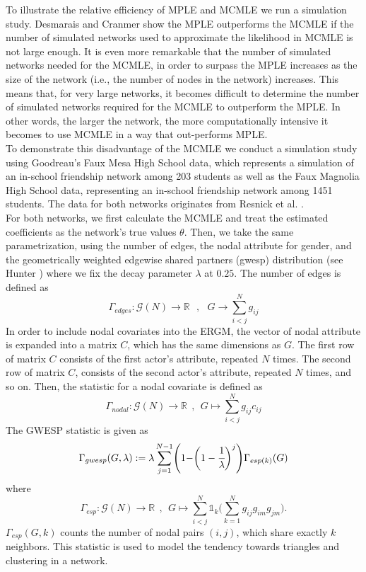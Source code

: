 \documentclass[10pt, conference, compsocconf]{IEEEtran}
\begin{document}
To illustrate the relative efficiency of MPLE and MCMLE we run a simulation study. Desmarais and Cranmer \cite{Desmarais.2012} show the MPLE outperforms the MCMLE if the number of simulated networks used to approximate the likelihood in MCMLE is not large enough. It is even more remarkable that the number of simulated networks needed for the MCMLE, in order to surpass the MPLE increases as the size of the network (i.e., the number of nodes in the network) increases. This means that, for very large networks, it becomes difficult to determine the number of simulated networks required for the MCMLE to outperform the MPLE. In other words, the larger the network, the more computationally intensive it becomes to use MCMLE in a way that out-performs MPLE.\\
\indent To demonstrate this disadvantage of the MCMLE we conduct a simulation study using Goodreau's \cite{HunterDavidR..2008} Faux Mesa High School data, which represents a simulation of an in-school friendship network among 203 students as well as the Faux Magnolia High School data, representing an in-school friendship network among 1451 students. The data for both networks originates from Resnick et al. \cite{Resnicketal1997}.\\
\indent For both networks, we first calculate the MCMLE and treat the estimated coefficients as the network's true values $\theta$. Then, we take the same parametrization, using the number of edges, the nodal attribute for gender, and the geometrically weighted edgewise shared partners (gwesp) distribution (see Hunter \cite{Hunter.2006}) where we fix the decay parameter $\lambda$ at $0.25$.
The number of edges is defined as
$$\Gamma_{edges}: \mathcal{G}(N) \to \mathbb{R}~~~, ~~~ G \to \sum_{i<j}^N g_{ij}$$
In order to include nodal covariates into the ERGM, the vector of nodal attribute is expanded into a matrix $C$, which has the same dimensions as $G$. The first row of matrix $C$ consists of the first actor's attribute, repeated $N$ times. The second row of matrix $C$, consists of the second actor's attribute, repeated $N$ times, and so on. Then, the statistic for a nodal covariate is defined as
$$\Gamma_{nodal}: \mathcal{G}(N) \to \mathbb{R}~~,~~G \mapsto \sum_{i<j}^{N}g_{ij}c_{ij}$$
The GWESP statistic is given as
$$\Gamma_{gwesp}(G,\lambda):= \lambda\sum_{j=1}^{N-1}\Biggr(1- \biggr(1-\cfrac{1}{\lambda}\biggl)^j\Biggl)\Gamma_{esp(k)}(G)$$
where 
$$
\Gamma_{esp}: \mathcal{G}(N) \to \mathbb{R}~~,~~G \mapsto \sum_{i<j}^{N}\mathds{1}_k\biggl(\sum_{k=1}^N g_{ij}g_{im}g_{jm}\biggr).
$$
$\Gamma_{esp}(G,k)$ counts the number of nodal pairs $(i,j)$, which share exactly $k$ neighbors. This statistic is used to model the tendency towards triangles and clustering in a network.\\
\end{document}

